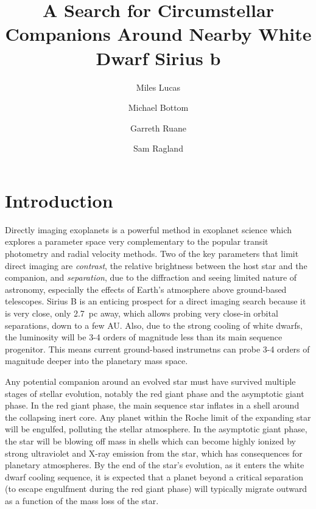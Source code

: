 \documentclass[twocolumn]{aastex631}
\begin{document}
\title{A Search for Circumstellar Companions Around Nearby White Dwarf Sirius b}


\author[0000-0001-6341-310X]{Miles Lucas}

\author[0000-0003-1341-5531]{Michael Bottom}

\author[0000-0003-4769-1665]{Garreth Ruane}

\author[0000-0002-0696-1780]{Sam Ragland}


\begin{abstract}

\end{abstract}

\section{Introduction}

Directly imaging exoplanets is a powerful method in exoplanet science which explores a parameter space very complementary to the popular transit photometry and radial velocity methods. Two of the key parameters that limit direct imaging are \textit{contrast}, the relative brightness between the host star and the companion, and \textit{separation}, due to the diffraction and seeing limited nature of astronomy, especially the effects of Earth's atmosphere above ground-based telescopes. Sirius B is an enticing prospect for a direct imaging search because it is very close, only \SI{2.7}{pc} away, which allows probing very close-in orbital separations, down to a few AU. Also, due to the strong cooling of white dwarfs, the luminosity will be 3-4 orders of magnitude less than its main sequence progenitor. This means current ground-based instrumetns can probe 3-4 orders of magnitude deeper into the planetary mass space.

Any potential companion around an evolved star must have survived multiple stages of stellar evolution, notably the red giant phase and the asymptotic giant phase. In the red giant phase, the main sequence star inflates in a shell around the collapsing inert core. Any planet within the Roche limit of the expanding star will be engulfed, polluting the stellar atmosphere. In the asymptotic giant phase, the star will be blowing off mass in shells which can become highly ionized by strong ultraviolet and X-ray emission from the star, which has consequences for planetary atmospheres. By the end of the star's evolution, as it enters the white dwarf cooling sequence, it is expected that a planet beyond a critical separation (to escape engulfment during the red giant phase) will typically migrate outward as a function of the mass loss of the star.
\end{document}
